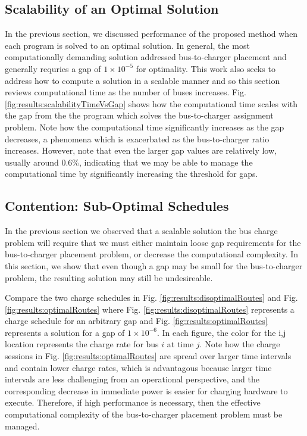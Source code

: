 \subsection{Scalability of an Optimal Solution}
In the previous section, we discussed performance of the proposed method when each program is solved to an optimal solution. In general, the most computationally demanding solution addressed bus-to-charger placement and generally requries a gap of $1\times10^{-5}$ for optimality. This work also seeks to address how to compute a solution in a scalable manner and so this section reviews computational time as the number of buses increases. Fig. \ref{fig:results:scalabilityTimeVsGap} shows how the computational time scales with the gap from the the program which solves the bus-to-charger assignment problem. Note how the computational time significantly increases as the gap decreases, a phenomena which is exacerbated as the bus-to-charger ratio increases. However, note that even the larger gap values are relatively low, usually around 0.6\%, indicating that we may be able to manage the computational time by significantly increasing the threshold for gaps. 

\subsection{Contention: Sub-Optimal Schedules}
In the previous section we observed that a scalable solution the bus charge problem will require that we must either maintain loose gap requirements for the bus-to-charger placement problem, or decrease the computational complexity. In this section, we show that even though a gap may be small for the bus-to-charger problem, the resulting solution may still be undesireable. 
\par Compare the two charge schedules in Fig. \ref{fig:results:disoptimalRoutes} and Fig. \ref{fig:results:optimalRoutes} where Fig. \ref{fig:results:disoptimalRoutes} represents a charge schedule for an arbitrary gap and Fig. \ref{fig:results:optimalRoutes} represents a solution for a gap of $1\times10^{-6}$. In each figure, the color for the i,j location represents the charge rate for bus $i$ at time $j$. Note how the charge sessions in Fig. \ref{fig:results:optimalRoutes} are spread over larger time intervals and contain lower charge rates, which is advantagous because larger time intervals are less challenging from an operational perspective, and the corresponding decrease in immediate power is easier for charging hardware to execute. Therefore, if high performance is necessary, then the effective computational complexity of the bus-to-charger placement problem must be managed.

 

